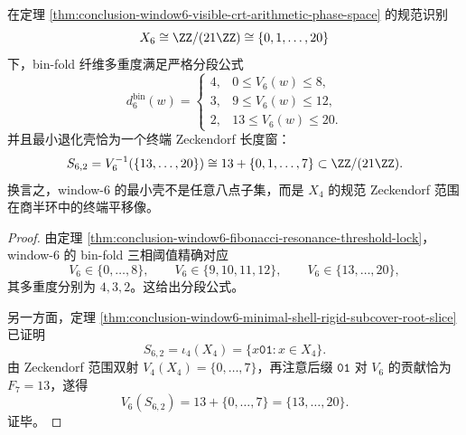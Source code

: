 \begin{theorem}\label{thm:conclusion-window6-residual-threeinterval-terminal-window}
在定理 \ref{thm:conclusion-window6-visible-crt-arithmetic-phase-space} 的规范识别
\[
X_6\cong \ZZ/(21\ZZ)\cong \{0,1,\dots,20\}
\]
下，bin-fold 纤维多重度满足严格分段公式
\[
d_6^{\mathrm{bin}}(w)=
\begin{cases}
4,& 0\le V_6(w)\le 8,\\[1mm]
3,& 9\le V_6(w)\le 12,\\[1mm]
2,& 13\le V_6(w)\le 20.
\end{cases}
\]
并且最小退化壳恰为一个终端 Zeckendorf 长度窗：
\[
S_{6,2}=V_6^{-1}(\{13,\dots,20\})
\cong
13+\{0,1,\dots,7\}
\subset \ZZ/(21\ZZ).
\]
换言之，window-\(6\) 的最小壳不是任意八点子集，而是 \(X_4\) 的规范 Zeckendorf 范围在商半环中的终端平移像。
\end{theorem}
\begin{proof}
由定理 \ref{thm:conclusion-window6-fibonacci-resonance-threshold-lock}，window-\(6\) 的 bin-fold 三相阈值精确对应
\[
V_6\in \{0,\dots,8\},\qquad V_6\in \{9,10,11,12\},\qquad V_6\in \{13,\dots,20\},
\]
其多重度分别为 \(4,3,2\)。这给出分段公式。

另一方面，定理 \ref{thm:conclusion-window6-minimal-shell-rigid-subcover-root-slice} 已证明
\[
S_{6,2}=\iota_4(X_4)=\{x\mathtt{01}:x\in X_4\}.
\]
由 Zeckendorf 范围双射 \(V_4(X_4)=\{0,\dots,7\}\)，再注意后缀 \(\mathtt{01}\) 对 \(V_6\) 的贡献恰为 \(F_7=13\)，遂得
\[
V_6(S_{6,2})=13+\{0,\dots,7\}=\{13,\dots,20\}.
\]
证毕。
\end{proof}

